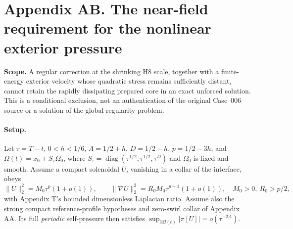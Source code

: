 \clearpage
\section*{Appendix AB. The near-field requirement for the nonlinear exterior pressure}
\noindent\textbf{Scope.} A regular correction at the shrinking H8 scale, together with a finite-energy exterior velocity whose quadratic stress remains sufficiently distant, cannot retain the rapidly dissipating prepared core in an exact unforced solution. This is a conditional exclusion, not an authentication of the original Case~006 source or a solution of the global regularity problem.

\paragraph{Setup.}
Let $\tau=T-t$, $0<h<1/6$, $A=1/2+h$, $D=1/2-h$, $p=1/2-3h$, and $\Omega(t)=x_0+S_\tau\Omega_0$, where $S_\tau=\operatorname{diag}(\tau^{1/2},\tau^{1/2},\tau^D)$ and $\Omega_0$ is fixed and smooth. Assume a compact solenoidal $U$, vanishing in a collar of the interface, obeys
\begin{equation}\label{eq:AB-core}
\|U\|_2^2=M_0\tau^p(1+o(1)),\qquad
\|\nabla U\|_2^2=R_0M_0\tau^{p-1}(1+o(1)),\quad
M_0>0,\ R_0>p/2,
\end{equation}
with Appendix T's bounded dimensionless Laplacian ratio. Assume also the strong compact reference-profile hypotheses and zero-swirl collar of Appendix AA. Its full \emph{periodic} self-pressure then satisfies $\sup_{\partial\Omega(t)}|\pi[U]|=o(\tau^{-2A})$.

